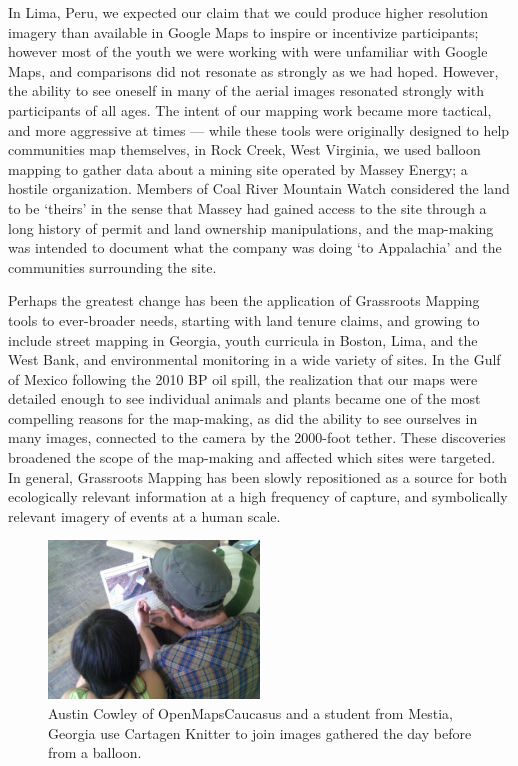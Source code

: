 \documentclass[11pt]{report}
\begin{document}
In Lima, Peru, we expected our claim that we could produce higher resolution imagery than available in Google Maps to inspire or incentivize participants; however most of the youth we were working with were unfamiliar with Google Maps, and comparisons did not resonate as strongly as we had hoped. However, the ability to see oneself in many of the aerial images resonated strongly with participants of all ages. The intent of our mapping work became more tactical, and more aggressive at times --- while these tools were originally designed to help communities map themselves, in Rock Creek, West Virginia, we used balloon mapping to gather data about a mining site operated by Massey Energy; a hostile organization. Members of Coal River Mountain Watch considered the land to be `theirs' in the sense that Massey had gained access to the site through a long history of permit and land ownership manipulations, and the map-making was intended to document what the company was doing `to Appalachia' and the communities surrounding the site.

Perhaps the greatest change has been the application of Grassroots Mapping tools to ever-broader needs, starting with land tenure claims, and growing to include street mapping in Georgia, youth curricula in Boston, Lima, and the West Bank, and environmental monitoring in a wide variety of sites. In the Gulf of Mexico following the 2010 BP oil spill, the realization that our maps were detailed enough to see individual animals and plants became one of the most compelling reasons for the map-making, as did the ability to see ourselves in many images, connected to the camera by the 2000-foot tether. These discoveries broadened the scope of the map-making and affected which sites were targeted. In general, Grassroots Mapping has been slowly repositioned as a source for both ecologically relevant information at a high frequency of capture, and symbolically relevant imagery of events at a human scale.

\begin{figure}
  \begin{flushleft}
	\includegraphics[width=0.5\textwidth]{images/knitter-mestia.jpg} 
	\caption{Austin Cowley of OpenMapsCaucasus and a student from Mestia, Georgia use Cartagen Knitter to join images gathered the day before from a balloon.}
  \end{flushleft}
\end{figure}
\end{document}
